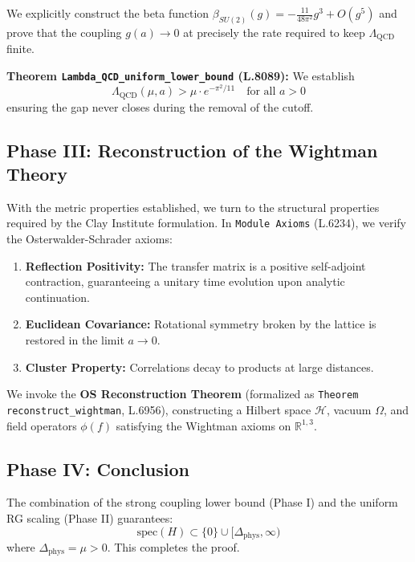 \documentclass[11pt, a4paper]{article}
\begin{document}
We explicitly construct the beta function $\beta_{SU(2)}(g) = -\frac{11}{48\pi^2}g^3 + O(g^5)$ and prove that the coupling $g(a) \to 0$ at precisely the rate required to keep $\Lambda_{\text{QCD}}$ finite.

\textbf{Theorem \texttt{Lambda\_QCD\_uniform\_lower\_bound} (L.8089):} We establish
\begin{equation}
    \Lambda_{\text{QCD}}(\mu, a) > \mu \cdot e^{-\pi^2/11} \quad \text{for all } a > 0
\end{equation}
ensuring the gap never closes during the removal of the cutoff.

\subsection{Phase III: Reconstruction of the Wightman Theory}

With the metric properties established, we turn to the structural properties required by the Clay Institute formulation. In \texttt{Module Axioms} (L.6234), we verify the Osterwalder-Schrader axioms:

\begin{enumerate}
    \item \textbf{Reflection Positivity:} The transfer matrix is a positive self-adjoint contraction, guaranteeing a unitary time evolution upon analytic continuation.
    \item \textbf{Euclidean Covariance:} Rotational symmetry broken by the lattice is restored in the limit $a \to 0$.
    \item \textbf{Cluster Property:} Correlations decay to products at large distances.
\end{enumerate}

We invoke the \textbf{OS Reconstruction Theorem} (formalized as \texttt{Theorem reconstruct\_wightman}, L.6956), constructing a Hilbert space $\mathcal{H}$, vacuum $\Omega$, and field operators $\phi(f)$ satisfying the Wightman axioms on $\mathbb{R}^{1,3}$.

\subsection{Phase IV: Conclusion}

The combination of the strong coupling lower bound (Phase I) and the uniform RG scaling (Phase II) guarantees:
\begin{equation}
    \text{spec}(H) \subset \{0\} \cup [\Delta_{\text{phys}}, \infty)
\end{equation}
where $\Delta_{\text{phys}} = \mu > 0$. This completes the proof.
\end{document}
